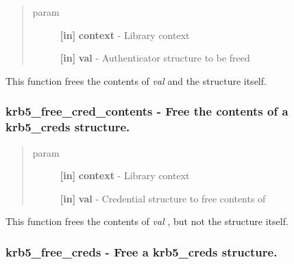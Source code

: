 \documentclass[letterpaper,10pt,english]{sphinxmanual}
\begin{document}
\begin{quote}\begin{description}
\item[{param}] \leavevmode
\textbf{{[}in{]}} \textbf{context} - Library context

\textbf{{[}in{]}} \textbf{val} - Authenticator structure to be freed

\end{description}\end{quote}

This function frees the contents of \emph{val} and the structure itself.


\subsubsection{krb5\_free\_cred\_contents -  Free the contents of a krb5\_creds structure.}
\label{appdev/refs/api/krb5_free_cred_contents::doc}\label{appdev/refs/api/krb5_free_cred_contents:krb5-free-cred-contents-free-the-contents-of-a-krb5-creds-structure}

\begin{fulllineitems}
\label{appdev/refs/api/krb5_free_cred_contents:krb5_free_cred_contents}
\end{fulllineitems}

\begin{quote}\begin{description}
\item[{param}] \leavevmode
\textbf{{[}in{]}} \textbf{context} - Library context

\textbf{{[}in{]}} \textbf{val} - Credential structure to free contents of

\end{description}\end{quote}

This function frees the contents of \emph{val} , but not the structure itself.


\subsubsection{krb5\_free\_creds -  Free a krb5\_creds structure.}
\label{appdev/refs/api/krb5_free_creds::doc}\label{appdev/refs/api/krb5_free_creds:krb5-free-creds-free-a-krb5-creds-structure}
\end{document}
